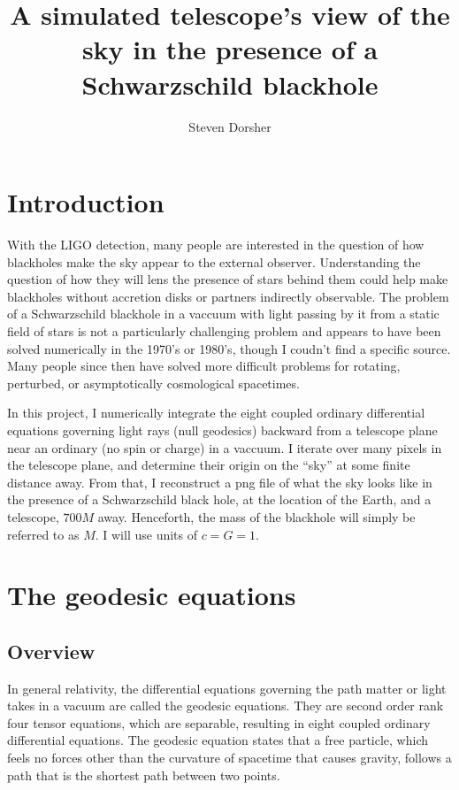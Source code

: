 \documentclass{article}
\begin{document}
\title{A simulated telescope's view of the sky in the presence of a Schwarzschild blackhole}
\author{Steven Dorsher}

\maketitle

\section{Introduction}
With the LIGO detection, many people are interested in the question of
how blackholes make the sky appear to the external
observer. Understanding the question of how they will lens the
presence of stars behind them could help make blackholes without
accretion disks or partners indirectly observable. The problem of a
Schwarzschild blackhole in a vaccuum with light passing by it from a
static field of stars is not a particularly challenging problem and
appears to have been solved numerically in the 1970's or 1980's,
though I coudn't find a specific source. Many people since then have
solved more difficult problems for rotating, perturbed, or
asymptotically cosmological spacetimes. 

In this project, I numerically integrate the eight coupled ordinary
differential equations governing light rays (null geodesics) backward
from a telescope plane near an ordinary (no spin or charge) in a
vaccuum. I iterate over many pixels in the telescope plane, and
determine their origin on the ``sky'' at some finite distance
away. From that, I reconstruct a png file of what the sky looks like
in the presence of a Schwarzschild black hole, at the location of the
Earth, and a telescope, $700 M$ away. Henceforth, the mass of the
blackhole will simply be referred to as $M$. I will use units of $c=G=1$.


\section{The geodesic equations}

\subsection{Overview}
In general relativity, the differential equations governing the path matter or light takes in a vacuum are called the geodesic equations. They are second order rank four tensor equations, which are separable, resulting in eight coupled ordinary differential equations. The geodesic equation states that a free particle, which feels no forces other than the curvature of spacetime that causes gravity, follows a path that is the shortest path between two points. 
\end{document}

